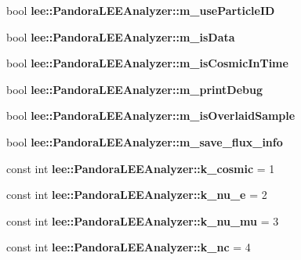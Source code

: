 \begin{DoxyCompactItemize}
\item 
\hypertarget{group__lee_ga0418238c0019b7fe0bad6117348ff4f3}{bool {\bfseries lee\-::\-Pandora\-L\-E\-E\-Analyzer\-::m\-\_\-use\-Particle\-I\-D}}\label{group__lee_ga0418238c0019b7fe0bad6117348ff4f3}

\item 
\hypertarget{group__lee_ga6dde30dd232da74cc8e5735babb021c8}{bool {\bfseries lee\-::\-Pandora\-L\-E\-E\-Analyzer\-::m\-\_\-is\-Data}}\label{group__lee_ga6dde30dd232da74cc8e5735babb021c8}

\item 
\hypertarget{group__lee_ga10e86bba3e7853bdf00765cb996830fb}{bool {\bfseries lee\-::\-Pandora\-L\-E\-E\-Analyzer\-::m\-\_\-is\-Cosmic\-In\-Time}}\label{group__lee_ga10e86bba3e7853bdf00765cb996830fb}

\item 
\hypertarget{group__lee_ga355302cac15228cf63650efc20765ab8}{bool {\bfseries lee\-::\-Pandora\-L\-E\-E\-Analyzer\-::m\-\_\-print\-Debug}}\label{group__lee_ga355302cac15228cf63650efc20765ab8}

\item 
\hypertarget{group__lee_gaf8c9bf05e68b489be6944d9b6ad9075f}{bool {\bfseries lee\-::\-Pandora\-L\-E\-E\-Analyzer\-::m\-\_\-is\-Overlaid\-Sample}}\label{group__lee_gaf8c9bf05e68b489be6944d9b6ad9075f}

\item 
\hypertarget{group__lee_ga9f323d5b266d64aa73a45e50ac3e1fe6}{bool {\bfseries lee\-::\-Pandora\-L\-E\-E\-Analyzer\-::m\-\_\-save\-\_\-flux\-\_\-info}}\label{group__lee_ga9f323d5b266d64aa73a45e50ac3e1fe6}

\item 
\hypertarget{group__lee_ga048d617faeb0aadea21f43c805dadb1f}{const int {\bfseries lee\-::\-Pandora\-L\-E\-E\-Analyzer\-::k\-\_\-cosmic} = 1}\label{group__lee_ga048d617faeb0aadea21f43c805dadb1f}

\item 
\hypertarget{group__lee_ga9d7e6f745c8e67c74f49b904cbfa5d61}{const int {\bfseries lee\-::\-Pandora\-L\-E\-E\-Analyzer\-::k\-\_\-nu\-\_\-e} = 2}\label{group__lee_ga9d7e6f745c8e67c74f49b904cbfa5d61}

\item 
\hypertarget{group__lee_gaeeae8fe7055f10e2f6a30892926fd510}{const int {\bfseries lee\-::\-Pandora\-L\-E\-E\-Analyzer\-::k\-\_\-nu\-\_\-mu} = 3}\label{group__lee_gaeeae8fe7055f10e2f6a30892926fd510}

\item 
\hypertarget{group__lee_ga27261a8cfcfebab466011b2952a8969b}{const int {\bfseries lee\-::\-Pandora\-L\-E\-E\-Analyzer\-::k\-\_\-nc} = 4}\label{group__lee_ga27261a8cfcfebab466011b2952a8969b}


\end{DoxyCompactItemize}
